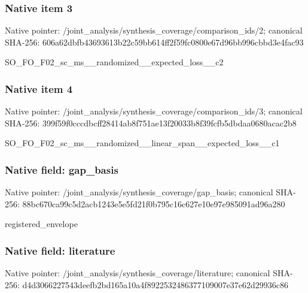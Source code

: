 \documentclass[10pt,a4paper]{article}
\begin{document}
\subsubsection{Native item 3}
Native pointer: /joint\_\allowbreak{}analysis/synthesis\_\allowbreak{}coverage/comparison\_\allowbreak{}ids/2; canonical SHA-256: 606a62dbfb43693613b22c59bb614ff2f59fc0800e67d96bb996cbbd3e4fac93

\begingroup\raggedright\sloppy SO\_\allowbreak{}FO\_\allowbreak{}F02\_\allowbreak{}sc\_\allowbreak{}ms\_\allowbreak{}\_\allowbreak{}randomized\_\allowbreak{}\_\allowbreak{}expected\_\allowbreak{}loss\_\allowbreak{}\_\allowbreak{}c2\par\endgroup

\subsubsection{Native item 4}
Native pointer: /joint\_\allowbreak{}analysis/synthesis\_\allowbreak{}coverage/comparison\_\allowbreak{}ids/3; canonical SHA-256: 399f59f0cccdbcff28414ab8f751ae13f20033b8f39fcfb5dbdaa0680acac2b8

\begingroup\raggedright\sloppy SO\_\allowbreak{}FO\_\allowbreak{}F02\_\allowbreak{}sc\_\allowbreak{}ms\_\allowbreak{}\_\allowbreak{}randomized\_\allowbreak{}\_\allowbreak{}linear\_\allowbreak{}span\_\allowbreak{}\_\allowbreak{}expected\_\allowbreak{}loss\_\allowbreak{}\_\allowbreak{}c1\par\endgroup

\subsubsection{Native field: gap\_\allowbreak{}basis}
Native pointer: /joint\_\allowbreak{}analysis/synthesis\_\allowbreak{}coverage/gap\_\allowbreak{}basis; canonical SHA-256: 88bc670ca99c5d2acb1243e5e5fd21f0b795c16c627e10e97e985091ad96a280

\begingroup\raggedright\sloppy registered\_\allowbreak{}envelope\par\endgroup

\subsubsection{Native field: literature}
Native pointer: /joint\_\allowbreak{}analysis/synthesis\_\allowbreak{}coverage/literature; canonical SHA-256: d4d3066227543deefb2bd165a10a4f8922532486377109007e37e62d29936c86
\end{document}

